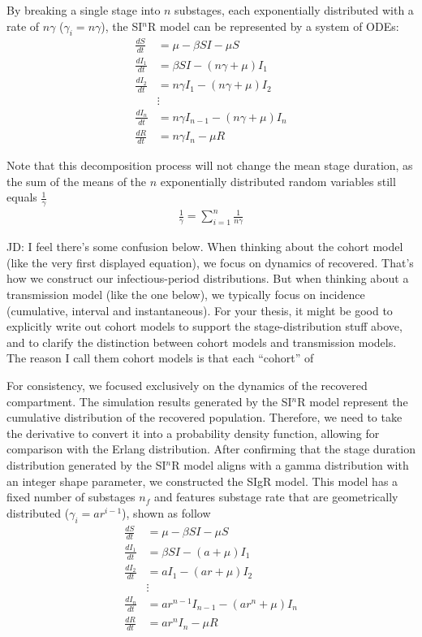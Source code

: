 \documentclass[12pt]{article}
\begin{document}
By breaking a single stage into $n$ substages, each exponentially distributed with a rate of $n\gamma$ ($\gamma_i = n\gamma$), the SI$^n$R model can be represented by a system of ODEs:
\begin{align*}
    \frac{dS}{dt} &= \mu - \beta SI - \mu S \\
    \frac{dI_1}{dt} &= \beta SI - (n \gamma + \mu) I_1 \\
    \frac{dI_2}{dt} &= n\gamma I_1 - (n \gamma + \mu) I_2 \\
    &\vdots \\
    \frac{dI_n}{dt} &= n\gamma I_{n-1} - (n \gamma + \mu) I_n \\
    \frac{dR}{dt} &= n \gamma I_n - \mu R
\end{align*}

Note that this decomposition process will not change the mean stage duration, as the sum of the means of the $n$ exponentially distributed random variables still equals $\frac{1}{\gamma}$
\begin{align*}
    \frac{1}{\gamma} = \sum_{i=1}^{n} \frac{1}{n\gamma}
\end{align*}

JD: I feel there's some confusion below. When thinking about the cohort model (like the very first displayed equation), we focus on dynamics of recovered. That's how we construct our infectious-period distributions. But when thinking about a transmission model (like the one below), we typically focus on incidence (cumulative, interval and instantaneous). For your thesis, it might be good to explicitly write out cohort models to support the stage-distribution stuff above, and to clarify the distinction between cohort models and transmission models. The reason I call them cohort models is that each “cohort” of 

For consistency, we focused exclusively on the dynamics of the recovered compartment. The simulation results generated by the SI$^n$R model represent the cumulative distribution of the recovered population. Therefore, we need to take the derivative to convert it into a probability density function, allowing for comparison with the Erlang distribution. After confirming that the stage duration distribution generated by the SI$^n$R model aligns with a gamma distribution with an integer shape parameter, we constructed the SIgR model. This model has a fixed number of substages $n_f$ and features substage rate that are geometrically distributed ($\gamma_i = ar^{i-1}$), shown as follow
\begin{align*}
    \frac{dS}{dt} &= \mu - \beta SI - \mu S \\
    \frac{dI_1}{dt} &= \beta SI - (a + \mu) I_1 \\
    \frac{dI_2}{dt} &= a I_1 - (ar + \mu) I_2 \\
    &\vdots \\
    \frac{dI_n}{dt} &= ar^{n-1} I_{n-1} - (ar^n + \mu) I_n \\
    \frac{dR}{dt} &= ar^n I_n - \mu R
\end{align*}
\end{document}
